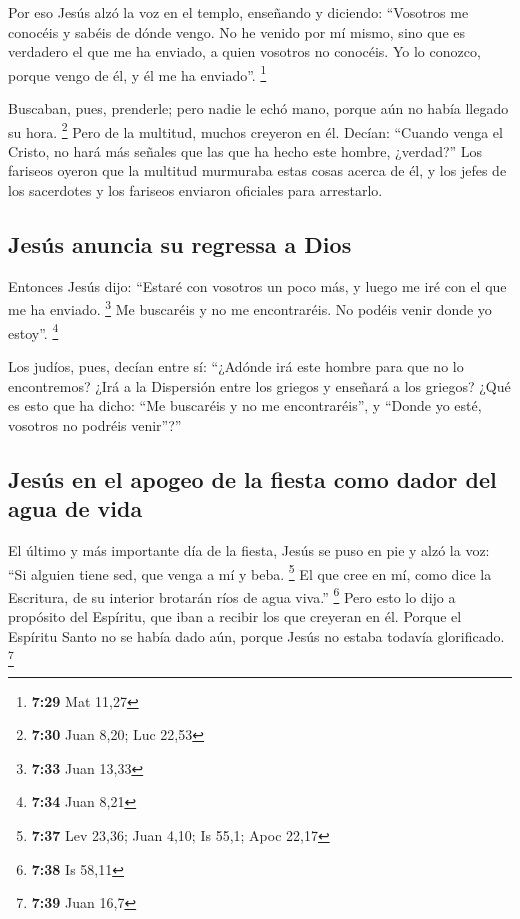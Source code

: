  Por eso Jesús alzó la voz en el templo, enseñando y
diciendo: ``Vosotros me conocéis y sabéis de dónde vengo. No he venido
por mí mismo, sino que es verdadero el que me ha enviado, a quien
vosotros no conocéis.  Yo lo conozco, porque vengo de él,
y él me ha enviado''. \footnote{\textbf{7:29} Mat 11,27}

 Buscaban, pues, prenderle; pero nadie le echó mano,
porque aún no había llegado su hora. \footnote{\textbf{7:30} Juan 8,20;
  Luc 22,53}  Pero de la multitud, muchos creyeron en él.
Decían: ``Cuando venga el Cristo, no hará más señales que las que ha
hecho este hombre, ¿verdad?''  Los fariseos oyeron que la
multitud murmuraba estas cosas acerca de él, y los jefes de los
sacerdotes y los fariseos enviaron oficiales para arrestarlo.

\hypertarget{jesuxfas-anuncia-su-regressa-a-dios}{%
\subsection{Jesús anuncia su regressa a
Dios}\label{jesuxfas-anuncia-su-regressa-a-dios}}

 Entonces Jesús dijo: ``Estaré con vosotros un poco más,
y luego me iré con el que me ha enviado. \footnote{\textbf{7:33} Juan
  13,33}  Me buscaréis y no me encontraréis. No podéis
venir donde yo estoy''. \footnote{\textbf{7:34} Juan 8,21}

 Los judíos, pues, decían entre sí: ``¿Adónde irá este
hombre para que no lo encontremos? ¿Irá a la Dispersión entre los
griegos y enseñará a los griegos?  ¿Qué es esto que ha
dicho: ``Me buscaréis y no me encontraréis'', y ``Donde yo esté,
vosotros no podréis venir''?''

\hypertarget{jesuxfas-en-el-apogeo-de-la-fiesta-como-dador-del-agua-de-vida}{%
\subsection{Jesús en el apogeo de la fiesta como dador del agua de
vida}\label{jesuxfas-en-el-apogeo-de-la-fiesta-como-dador-del-agua-de-vida}}

 El último y más importante día de la fiesta, Jesús se
puso en pie y alzó la voz: ``Si alguien tiene sed, que venga a mí y
beba. \footnote{\textbf{7:37} Lev 23,36; Juan 4,10; Is 55,1; Apoc 22,17}
 El que cree en mí, como dice la Escritura, de su
interior brotarán ríos de agua viva.'' \footnote{\textbf{7:38} Is 58,11}
 Pero esto lo dijo a propósito del Espíritu, que iban a
recibir los que creyeran en él. Porque el Espíritu Santo no se había
dado aún, porque Jesús no estaba todavía glorificado. \footnote{\textbf{7:39}
  Juan 16,7}

